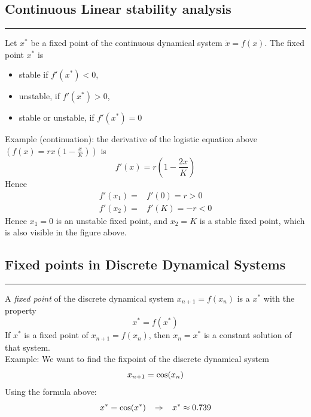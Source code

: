 \subsection{Continuous Linear stability analysis}
\noindent\rule[\linienAbstand]{\linewidth}{\linienDicke}
Let $x^*$ be a fixed point of the continuous dynamical system $\dot{x} = f(x)$. The fixed point $x^*$ is
\begin{itemize}
  \item stable if $f'(x^*) < 0$,
  \item unstable, if $f'(x^*) > 0$,
  \item stable or unstable, if $f'(x^*) = 0$
\end{itemize}

Example (continuation): the derivative of the logistic equation above $\left(f(x) = rx\left(1-\frac{x}{K}\right)\right)$ is
\begin{equation}
  f'(x) = r\left(1-\frac{2x}{K}\right)
\end{equation}
Hence
\begin{equation}
  \begin{split}
    f'(x_1) =& f'(0) = r > 0\\
    f'(x_2) =& f'(K) = -r < 0
  \end{split}
\end{equation}
Hence $x_1 = 0$ is an unstable fixed point, and $x_2 = K$ is a stable fixed point, which is also visible in the figure above.

\subsection{Fixed points in Discrete Dynamical Systems}
\noindent\rule[\linienAbstand]{\linewidth}{\linienDicke}
A \emph{fixed point} of the discrete dynamical system $x_{n+1} = f(x_n)$ is a $x^*$ with the property
\begin{equation}
  x^* = f(x^*)
\end{equation}
If $x^*$ is a fixed point of $x_{n+1} = f(x_n)$, then $x_n = x^*$ is a constant solution of that system.\\

Example: We want to find the fixpoint of the discrete dynamical system
\begin{equation}
  x_{n+1} = \textup{cos}(x_n)
\end{equation}
Using the formula above:
\begin{equation}
  x^* = \textup{cos}(x^*) \:\;\; \Rightarrow \;\;\; x^* \approx 0.739
\end{equation}

